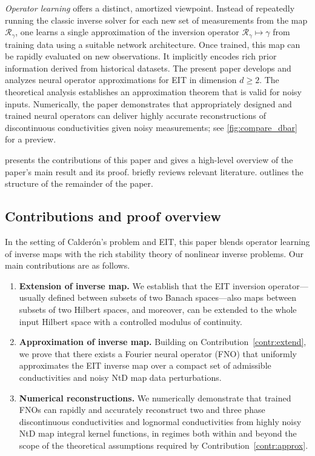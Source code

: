 \documentclass[pdflatex,sn-mathphys-num]{sn-jnl-preprint}
\newcommand{\ntd}{\mathscr{R}_{\gamma}}
\theoremstyle{thmstyleone}%
\theoremstyle{thmstyletwo}%
\theoremstyle{thmstylethree}%
\numberwithin{equation}{section}
\numberwithin{theorem}{section}
\begin{document}
\emph{Operator learning} offers a distinct, amortized viewpoint. Instead of repeatedly running the classic inverse solver for each new set of measurements from the map $\ntd$, one learns a single approximation of the inversion operator $\ntd\mapsto\gamma $ from training data using a suitable network architecture. Once trained, this map can be rapidly evaluated on new observations. It implicitly encodes rich prior information derived from historical datasets. The present paper develops and analyzes neural operator approximations for EIT in dimension $d\geq 2$. The theoretical analysis establishes an approximation theorem that is valid for noisy inputs. Numerically, the paper demonstrates that appropriately designed and trained neural operators can deliver highly accurate reconstructions of discontinuous conductivities given noisy measurements; see \cref{fig:compare_dbar} for a preview.

 presents the contributions of this paper and gives a high-level overview of the paper's main result and its proof.  briefly reviews relevant literature.  outlines the structure of the remainder of the paper.

\subsection{Contributions and proof overview}\label{sec:intro_contrib}
In the setting of Calder\'on's problem and EIT, this paper blends operator learning of inverse maps with the rich stability theory of nonlinear inverse problems. Our main contributions are as follows.

\begin{enumerate}[label=(C\arabic*),leftmargin=2.5\parindent,topsep=1.67ex,itemsep=0.5ex,partopsep=1ex,parsep=1ex]
    \item \label{contr:extend} \textbf{Extension of inverse map.}\indent
    We establish that the EIT inversion operator---usually defined between subsets of two Banach spaces---also maps between subsets of two Hilbert spaces, and moreover, can be extended to the whole input Hilbert space with a controlled modulus of continuity.

    \item \label{contr:approx} \textbf{Approximation of inverse map.}\indent
    Building on Contribution~\ref{contr:extend}, we prove that there exists a Fourier neural operator (FNO) \cite{li2020fourier} that uniformly approximates the EIT inverse map over a compact set of admissible conductivities and noisy NtD map data perturbations.

    \item \label{contr:numeric} \textbf{Numerical reconstructions.}\indent
    We numerically demonstrate that trained FNOs can rapidly and accurately reconstruct two and three phase discontinuous conductivities and lognormal conductivities from highly noisy NtD map integral kernel functions, in regimes both within and beyond the scope of the theoretical assumptions required by Contribution~\ref{contr:approx}.
\end{enumerate}
\end{document}
